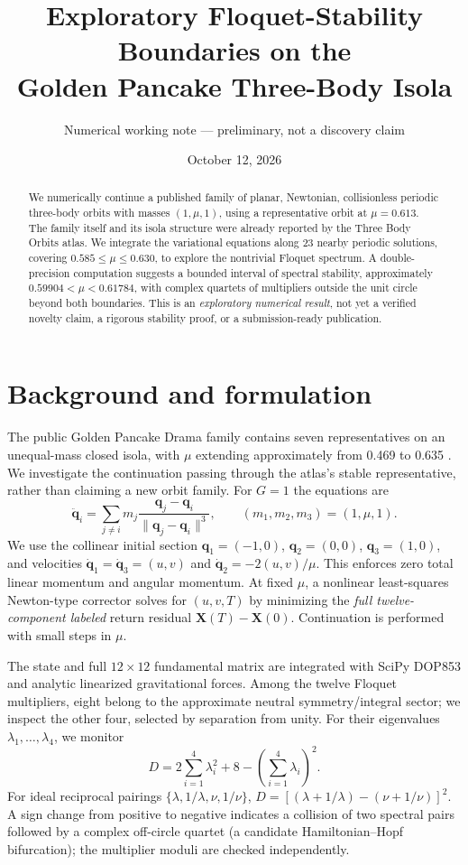 \documentclass[10pt]{article}
\title{Exploratory Floquet-Stability Boundaries on the\\ Golden Pancake Three-Body Isola}
\author{Numerical working note --- preliminary, not a discovery claim}
\date{October 12, 2026}
\begin{document}
\maketitle
\vspace{-1em}
\begin{abstract}
We numerically continue a published family of planar, Newtonian, collisionless periodic three-body orbits with masses $(1,\mu,1)$, using a representative orbit at $\mu=0.613$. The family itself and its isola structure were already reported by the Three Body Orbits atlas. We integrate the variational equations along 23 nearby periodic solutions, covering $0.585\leq\mu\leq0.630$, to explore the nontrivial Floquet spectrum. A double-precision computation suggests a bounded interval of spectral stability, approximately $0.59904<\mu<0.61784$, with complex quartets of multipliers outside the unit circle beyond both boundaries. This is an \emph{exploratory numerical result}, not yet a verified novelty claim, a rigorous stability proof, or a submission-ready publication.
\end{abstract}
\section{Background and formulation}
The public Golden Pancake Drama family contains seven representatives on an unequal-mass closed isola, with $\mu$ extending approximately from 0.469 to 0.635 \cite{atlasfamily,atlasabout}. We investigate the continuation passing through the atlas's stable representative, rather than claiming a new orbit family. For $G=1$ the equations are
\begin{equation}
 \ddot{\mathbf q}_i = \sum_{j\ne i}m_j\frac{\mathbf q_j-\mathbf q_i}{\lVert \mathbf q_j-\mathbf q_i\rVert^3},\qquad (m_1,m_2,m_3)=(1,\mu,1).
\end{equation}
We use the collinear initial section $\mathbf q_1=(-1,0)$, $\mathbf q_2=(0,0)$, $\mathbf q_3=(1,0)$, and velocities $\dot{\mathbf q}_1=\dot{\mathbf q}_3=(u,v)$ and $\dot{\mathbf q}_2=-2(u,v)/\mu$. This enforces zero total linear momentum and angular momentum. At fixed $\mu$, a nonlinear least-squares Newton-type corrector solves for $(u,v,T)$ by minimizing the \emph{full twelve-component labeled} return residual $\mathbf X(T)-\mathbf X(0)$. Continuation is performed with small steps in $\mu$.

The state and full $12\times12$ fundamental matrix are integrated with SciPy DOP853 and analytic linearized gravitational forces. Among the twelve Floquet multipliers, eight belong to the approximate neutral symmetry/integral sector; we inspect the other four, selected by separation from unity. For their eigenvalues $\lambda_1,\ldots,\lambda_4$, we monitor
\begin{equation}
 D=2\sum_{i=1}^4\lambda_i^2+8-\left(\sum_{i=1}^4\lambda_i\right)^2.
\end{equation}
For ideal reciprocal pairings $\{\lambda,1/\lambda,\nu,1/\nu\}$, $D=[(\lambda+1/\lambda)-(\nu+1/\nu)]^2$. A sign change from positive to negative indicates a collision of two spectral pairs followed by a complex off-circle quartet (a candidate Hamiltonian--Hopf bifurcation); the multiplier moduli are checked independently.
\end{document}
